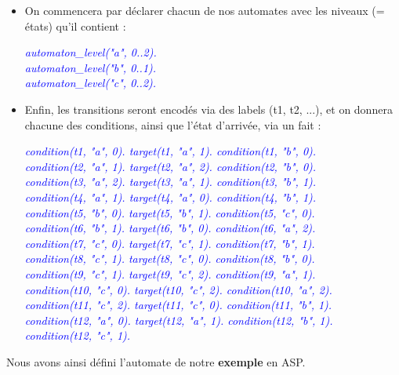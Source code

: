 \documentclass[12pt,a4paper]{article}
\begin{document}
\begin{itemize}
	\item On commencera par déclarer chacun de nos automates avec les niveaux (= états) qu'il contient :
	\begin {center}
	\emph{
		\textcolor{blue}{
		automaton\_level("a", 0..2).\\
		automaton\_level("b", 0..1).\\
		automaton\_level("c", 0..2).\\
		}
	}
	\end{center}
	\item Enfin, les transitions seront encodés via des labels (t1, t2, ...), et on donnera chacune des conditions, ainsi que l'état d'arrivée, via un fait :
	\begin {center}
	\emph{
		\textcolor{blue}{
		condition(t1, "a", 0). target(t1, "a", 1). condition(t1, "b", 0).\\
		condition(t2, "a", 1). target(t2, "a", 2). condition(t2, "b", 0).\\
		condition(t3, "a", 2). target(t3, "a", 1). condition(t3, "b", 1).\\
		condition(t4, "a", 1). target(t4, "a", 0). condition(t4, "b", 1).\\
		condition(t5, "b", 0). target(t5, "b", 1). condition(t5, "c", 0).\\
		condition(t6, "b", 1). target(t6, "b", 0). condition(t6, "a", 2).\\
		condition(t7, "c", 0). target(t7, "c", 1). condition(t7, "b", 1).\\
		condition(t8, "c", 1). target(t8, "c", 0). condition(t8, "b", 0).\\
		condition(t9, "c", 1). target(t9, "c", 2). condition(t9, "a", 1).\\
		condition(t10, "c", 0). target(t10, "c", 2). condition(t10, "a", 2).\\
		condition(t11, "c", 2). target(t11, "c", 0). condition(t11, "b", 1).\\
		condition(t12, "a", 0). target(t12, "a", 1). condition(t12, "b", 1). condition(t12, "c", 1).\\
		}
	}
	\end{center}
\end{itemize}
Nous avons ainsi défini l'automate de notre \textbf{exemple} en ASP.
\end{document}
